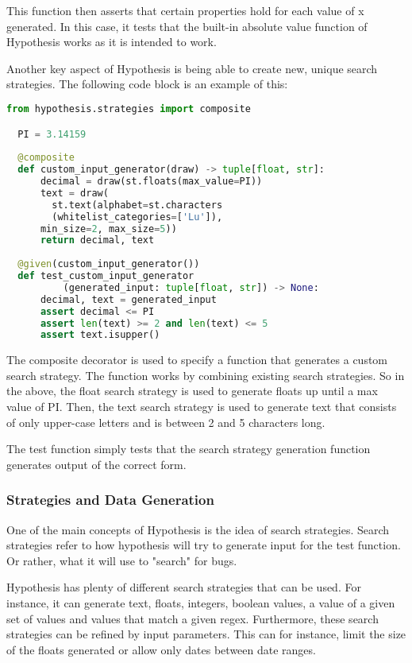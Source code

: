 \documentclass[runningheads]{llncs}
\begin{document}
This function then asserts that certain properties hold for each value of x generated. In this case, it tests that the built-in absolute value function of Hypothesis works as it is intended to work.

Another key aspect of Hypothesis is being able to create new, unique search strategies. The following code block is an example of this:

\begin{lstlisting}[language=Python,caption={Complex Input Example from code/tutorial.ipynb}]
  from hypothesis.strategies import composite

  PI = 3.14159
  
  @composite
  def custom_input_generator(draw) -> tuple[float, str]:
      decimal = draw(st.floats(max_value=PI))
      text = draw(
        st.text(alphabet=st.characters
        (whitelist_categories=['Lu']), 
      min_size=2, max_size=5))
      return decimal, text
  
  @given(custom_input_generator())
  def test_custom_input_generator
          (generated_input: tuple[float, str]) -> None:
      decimal, text = generated_input
      assert decimal <= PI
      assert len(text) >= 2 and len(text) <= 5
      assert text.isupper()
\end{lstlisting}

The composite decorator is used to specify a function that generates a custom search strategy. The function works by combining existing search strategies. So in the above, the float search strategy is used to generate floats up until a max value of PI. Then, the text search strategy is used to generate text that consists of only upper-case letters and is between 2 and 5 characters long.

The test function simply tests that the search strategy generation function generates output of the correct form.

\subsubsection{Strategies and Data Generation}
One of the main concepts of Hypothesis is the idea of search strategies. Search strategies refer to how hypothesis will try to generate input for the test function. Or rather, what it will use to "search" for bugs.

Hypothesis has plenty of different search strategies that can be used. For instance, it can generate text, floats, integers, boolean values, a value of a given set of values and values that match a given regex. Furthermore, these search strategies can be refined by input parameters. This can for instance, limit the size of the floats generated or allow only dates between date ranges.
\end{document}
